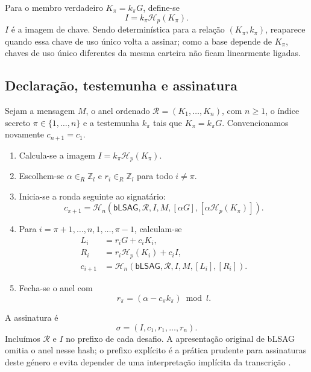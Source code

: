 Para o membro verdadeiro \(K_\pi=k_\pi G\), define-se
\[
I=k_\pi\mathcal H_p(K_\pi).
\]
\(I\) é a imagem de chave. Sendo determinística para a relação
\((K_\pi,k_\pi)\), reaparece quando essa chave de uso único volta a assinar;
como a base depende de \(K_\pi\), chaves de uso único diferentes da mesma
carteira não ficam linearmente ligadas.

\subsection*{Declaração, testemunha e assinatura}

Sejam a mensagem \(M\), o anel ordenado
\(\mathcal R=(K_1,\ldots,K_n)\), com \(n\geq1\), o índice secreto
\(\pi\in\{1,\ldots,n\}\) e a testemunha \(k_\pi\) tais que
\(K_\pi=k_\pi G\). Convencionamos novamente \(c_{n+1}=c_1\).

\begin{enumerate}
    \item Calcula-se a imagem
    \(I=k_\pi\mathcal H_p(K_\pi)\).

    \item Escolhem-se \(\alpha\in_R\mathbb Z_l\) e
    \(r_i\in_R\mathbb Z_l\) para todo \(i\neq\pi\).

    \item Inicia-se a ronda seguinte ao signatário:
    \[
    c_{\pi+1}=\mathcal H_n(\mathsf{bLSAG},\mathcal R,I,M,
      [\alpha G],[\alpha\mathcal H_p(K_\pi)]).
    \]

    \item Para
    \(i=\pi+1,\ldots,n,1,\ldots,\pi-1\), calculam-se
    \begin{align*}
    L_i&=r_iG+c_iK_i,\\
    R_i&=r_i\mathcal H_p(K_i)+c_iI,\\
    c_{i+1}
      &=\mathcal H_n(\mathsf{bLSAG},\mathcal R,I,M,
                     [L_i],[R_i]).
    \end{align*}

    \item Fecha-se o anel com
    \[
    r_\pi=(\alpha-c_\pi k_\pi)\bmod l.
    \]
\end{enumerate}

A assinatura é
\[
\sigma=(I,c_1,r_1,\ldots,r_n).
\]
Incluímos \(\mathcal R\) e \(I\) no prefixo de cada desafio. A apresentação
original de bLSAG omitia o anel nesse hash; o prefixo explícito é a prática
prudente para assinaturas deste género e evita depender de uma interpretação
implícita da transcrição \cite{key-prefix-paper}.

